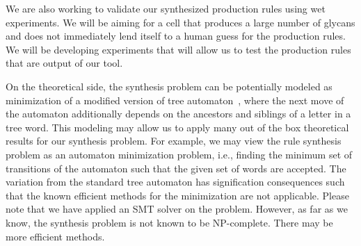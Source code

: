We are also working to validate our synthesized production rules using wet experiments.
We will be aiming for a cell that produces a large number of glycans and
does not immediately lend itself to a human guess for the production rules.
We will be developing experiments that will allow us to test the production rules
that are output of our tool.

On the theoretical side, the synthesis problem can be potentially
modeled as minimization of a modified version of tree automaton~\cite{minTree},
where the next move of the automaton additionally depends on the ancestors
and siblings of a letter in a tree word.
This modeling may allow us to apply many out of the box theoretical results
for our synthesis problem.
For example, we may view the rule synthesis problem as an automaton minimization problem, i.e.,
finding the minimum set of transitions of the automaton such that the given set of
words are accepted.
The variation from the standard tree automaton has signification consequences such that
the known efficient methods for the minimization are not applicable.
Please note that we have applied an SMT solver on the problem.
However, as far as we know, the synthesis problem is not known to be NP-complete. There may be more efficient methods.


